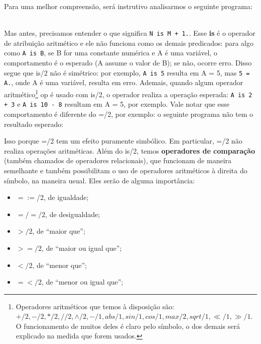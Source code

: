 \documentclass{article}
\theoremstyle{remark}
\begin{document}
Para uma melhor compreensão, será instrutivo analisarmos o seguinte programa:
\\
\\


\label{lst:length}

Mas antes, precisamos entender o que significa {\tt N is M + 1.}. Esse \textbf{is} é o operador de atribuição aritmético e ele não funciona como os demais predicados: para algo como {\tt A is B}, se B for uma constante numérica e A é uma variável, o comportamento é o esperado (A assume o valor de B); se não, ocorre erro. Disso segue que is/2 não é simétrico: por exemplo, {\tt A is 5} resulta em A = 5, mas {\tt 5 = A.}, %
onde A é uma variável, resulta em erro. Ademais, quando algum
operador aritmético\footnote{Operadores aritméticos que temos à disposição são: $+/2, -/2, */2, //2, \wedge/2, -/1, abs/1, sin/1, cos/1, max/2, sqrt/1, \ll/1, \gg/1$. O funcionamento de muitos deles é claro pelo símbolo, o dos demais será explicado na medida que forem usados.} op é usado com is/2, o operador realiza a operação esperada: {\tt A is 2 + 3} e {\tt A is 10 - 8} resultam em A = 5, por exemplo. Vale notar que esse comportamento é diferente do =/2, por exemplo: o seguinte programa não tem o resultado esperado:



\noindent Isso porque =/2 tem um efeito puramente simbólico. Em particular, =/2 não realiza operações aritméticas. Além do is/2, temos \textbf{operadores de comparação} (também chamados de operadores relacionais), que funcionam de maneira semelhante e também possibilitam o uso de operadores aritméticos à direita do símbolo, na maneira usual. Eles serão de alguma importância:

\begin{itemize}
  \item $=:=$/2, de igualdade;
  \item $=/=/2$, de desigualdade;
  \item $>/2  $, de ``maior que'';
  \item $>=/2$, de ``maior ou igual que'';
  \item $</2 $, de ``menor que'';
  \item $=</2$, de ``menor ou igual que'';
\end{itemize}
\end{document}
